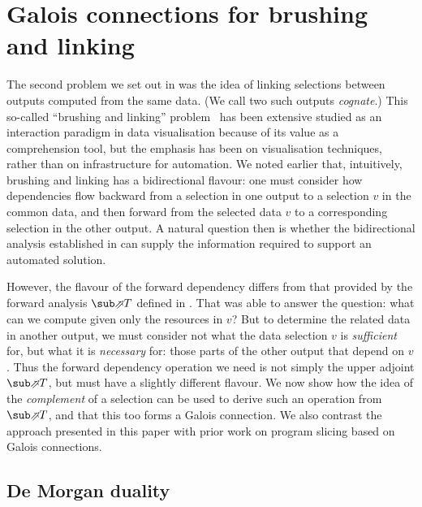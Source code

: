\section{Galois connections for brushing and linking}
\label{sec:toolkit}

The second problem we set out in  was the idea of linking selections between outputs computed from the same data. (We call two such outputs \emph{cognate}.) This so-called ``brushing and linking'' problem~\cite{becker87} has been extensive studied as an interaction paradigm in data visualisation because of its value as a comprehension tool, but the emphasis has been on visualisation techniques, rather than on infrastructure for automation. We noted earlier that, intuitively, brushing and linking has a bidirectional flavour: one must consider how dependencies flow backward from a selection in one output to a selection $v$ in the common data, and then forward from the selected data $v$ to a corresponding selection in the other output. A natural question then is whether the bidirectional analysis established in  can supply the information required to support an automated solution.

However, the flavour of the forward dependency differs from that provided by the forward analysis $\evalFwdF{T}$ defined in . That was able to answer the question: what can we compute given only the resources in $v$? But to determine the related data in another output, we must consider not what the data selection $v$ is \emph{sufficient} for, but what it is \emph{necessary} for: those parts of the other output that depend on $v$. Thus the forward dependency operation we need is not simply the upper adjoint $\evalFwdF{T}$, but must have a slightly different flavour. We now show how the idea of the \emph{complement} of a selection can be used to derive such an operation from $\evalFwdF{T}$, and that this too forms a Galois connection. We also contrast the approach presented in this paper with prior work on program slicing based on Galois connections.

\subsection{De Morgan duality}


